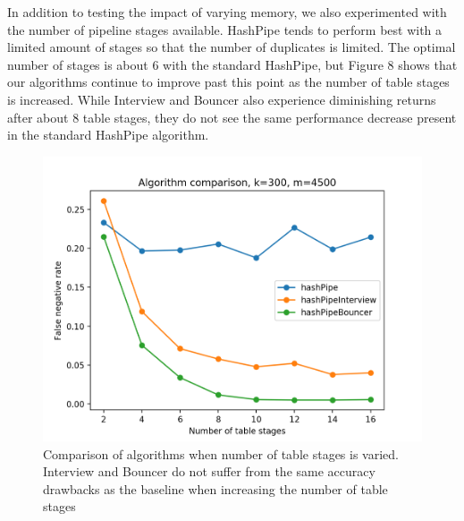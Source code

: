 In addition to testing the impact of varying memory, we also experimented with the number of pipeline stages available. HashPipe tends to perform best with a limited amount of stages so that the number of duplicates is limited. The optimal number of stages is about 6 with the standard HashPipe, but Figure 8 shows that our algorithms continue to improve past this point as the number of table stages is increased. While Interview and Bouncer also experience diminishing returns after about 8 table stages, they do not see the same performance decrease present in the standard HashPipe algorithm.
\begin{figure}[t]
  \centering
    \includegraphics[scale=0.5]{stageComparison}
     \caption{Comparison of algorithms when number of table stages is varied. Interview and Bouncer do not suffer from the same accuracy drawbacks as the baseline when increasing the number of table stages}
     \label{fig:bp-image}
\end{figure}
